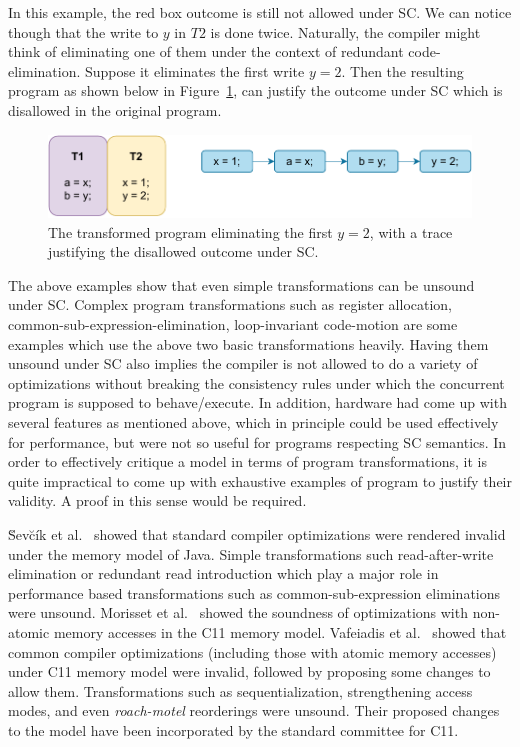     In this example, the red box outcome is still not allowed under SC. We can notice though that the write to $y$ in $T2$ is done twice. 
    Naturally, the compiler might think of eliminating one of them under the context of redundant code-elimination. 
    Suppose it eliminates the first write $y=2$. 
    Then the resulting program as shown below in Figure~\ref{intro:Example3(b)}, can justify the outcome under SC which is disallowed in the original program.
    \begin{figure}[H]
        \centering
        \includegraphics[scale=0.7]{2.Background/SC_Example2(b).pdf}
        \caption{The transformed program eliminating the first $y=2$, with a trace justifying the disallowed outcome under SC.}
        \label{intro:Example3(b)}
    \end{figure}

    The above examples show that even simple transformations can be unsound under SC. Complex program transformations such as register allocation, common-sub-expression-elimination, loop-invariant code-motion are some examples which use the above two basic transformations heavily. 
    Having them unsound under SC also implies the compiler is not allowed to do a variety of optimizations without breaking the consistency rules under which the concurrent program is supposed to behave/execute. 
    In addition, hardware had come up with several features as mentioned above, which in principle could be used effectively for performance, but were not so useful for programs respecting SC semantics. 
    In order to effectively critique a model in terms of program transformations, it is quite impractical to come up with exhaustive examples of program to justify their validity.
    A proof in this sense would be required.  

    \u{S}ev\u{c}\'{i}k et al.~\cite{SevcikJ} showed that standard compiler optimizations were rendered invalid under the memory model of Java. 
    Simple transformations such read-after-write elimination or redundant read introduction which play a major role in performance based transformations such as common-sub-expression eliminations were unsound. 
    Morisset et al.~\cite{Morisset} showed the soundness of optimizations with non-atomic memory accesses in the C11 memory model. 
    Vafeiadis et al.~\cite{VafeiadisV} showed that common compiler optimizations (including those with atomic memory accesses) under C11 memory model were invalid, followed by proposing some changes to allow them. 
    Transformations such as sequentialization, strengthening access modes, and even \textit{roach-motel} reorderings were unsound. Their proposed changes to the model have been incorporated by the standard committee for C11. 

